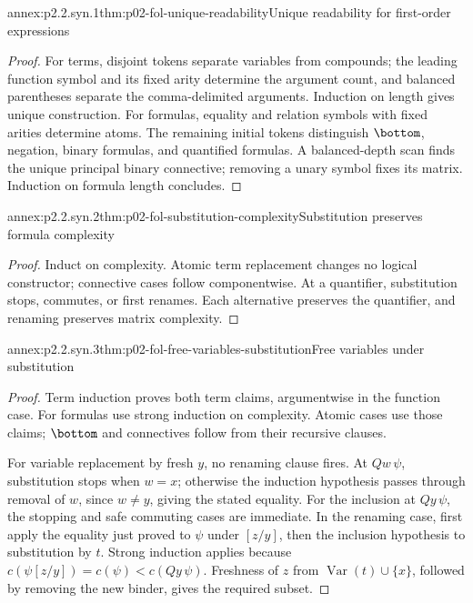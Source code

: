 
\begin{annexitem}{annex:p2.2.syn.1}{thm:p02-fol-unique-readability}{Unique readability for first-order expressions}
\begin{proof}
For terms, disjoint tokens separate variables from compounds; the leading
function symbol and its fixed arity determine the argument count, and balanced
parentheses separate the comma-delimited arguments.  Induction on length gives
unique construction.  For formulas, equality and relation symbols with fixed
arities determine atoms.  The remaining initial tokens distinguish
\(\bottom\), negation, binary formulas, and quantified formulas.  A
balanced-depth scan finds the unique principal binary connective; removing a
unary symbol fixes its matrix.  Induction on formula length concludes.
\end{proof}
\end{annexitem}

\begin{annexitem}{annex:p2.2.syn.2}{thm:p02-fol-substitution-complexity}{Substitution preserves formula complexity}
\begin{proof}
Induct on complexity.  Atomic term replacement changes no logical constructor;
connective cases follow componentwise.  At a quantifier, substitution stops,
commutes, or first renames.  Each alternative preserves the quantifier, and
renaming preserves matrix complexity.
\end{proof}
\end{annexitem}

\begin{annexitem}{annex:p2.2.syn.3}{thm:p02-fol-free-variables-substitution}{Free variables under substitution}
\begin{proof}
Term induction proves both term claims, argumentwise in the function case.
For formulas use strong induction on complexity.  Atomic cases use those
claims; \(\bottom\) and connectives follow from their recursive clauses.

For variable replacement by fresh \(y\), no renaming clause fires.  At
\(Qw\,\psi\), substitution stops when \(w=x\); otherwise the induction
hypothesis passes through removal of \(w\), since \(w\ne y\), giving the
stated equality.  For the inclusion at \(Qy\,\psi\), the stopping and safe
commuting cases are immediate.  In the renaming case, first apply the equality
just proved to \(\psi\) under \([z/y]\), then the inclusion hypothesis to substitution
by \(t\).  Strong induction applies because
\(c(\psi[z/y])=c(\psi)<c(Qy\,\psi)\).  Freshness of \(z\) from
\(\operatorname{Var}(t)\cup\{x\}\), followed by removing the new binder,
gives the required subset.
\end{proof}
\end{annexitem}

